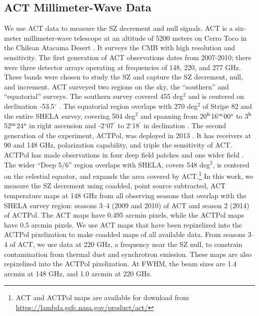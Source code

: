 \documentclass[a4paper,fleqn,usenatbib]{mnras}
\begin{document}
\subsection{ACT Millimeter-Wave Data}
We use ACT data to measure the SZ decrement and null signals. 
ACT is a six-meter millimeter-wave telescope at an altitude of 5200 meters on Cerro Toco in the Chilean Atacama Desert \citep{2011ApJS..194...41S}. 
It surveys the CMB with high resolution and sensitivity. 
The first generation of ACT observations dates from 2007-2010; there were three detector arrays operating at frequencies of 148, 220, and 277 GHz. 
These bands were chosen to study the SZ and capture the SZ decrement, null, and increment. 
ACT surveyed two regions on the sky, the ``southern'' and ``equatorial'' surveys. 
The southern survey covered 455 deg$^2$ and is centered on declination -53.5$^{\circ}$ \citep{2011ApJ...731..100M}. 
The equatorial region overlaps with 270 deg$^2$ of Stripe 82 and the entire SHELA survey, covering 504 deg$^2$ and spanning from 20$^{\rm h}$16$^{\rm m}$00$^{\rm s}$ to 3$^{\rm h}$52$^{\rm m}$24$^{\rm s}$ in right ascension and -2$^{\circ}$07$^{\prime}$ to 2$^{\circ}$18$^{\prime}$ in declination \citep{2013JCAP...07..008H}. 
The second generation of the experiment, ACTPol, was deployed in 2013   \citep{2016ApJS..227...21T}.
It has receivers at 90 and 148 GHz, polarization capability,  and triple the sensitivity of ACT. 
ACTPol has made observations in four deep field patches and one wider field \citep{2014JCAP...10..007N,2018ApJS..235...20H}. 
The wider ``Deep 5/6'' region overlaps with SHELA, covers 548 deg$^2$, is centered on the celestial equator, and expands the area covered by ACT.\footnote{ACT and ACTPol maps are available for download from \url{https://lambda.gsfc.nasa.gov/product/act/}}
In this work, we measure the SZ decrement using coadded, point source subtracted, ACT temperature maps at 148 GHz from all observing seasons that overlap with the SHELA survey region: seasons 3--4 (2009 and 2010) of ACT and season 2 (2014) of ACTPol. 
The ACT maps have 0.495 arcmin pixels, while the ACTPol maps have 0.5 arcmin pixels. 
We use ACT maps that have been repixelized into the ACTPol pixelization to make coadded maps of all available data. %
From seasons 3--4 of ACT, we use data at 220 GHz, a frequency near the SZ null, to constrain contamination from thermal dust and synchrotron emission. 
These maps are also repixelized into the ACTPol pixelization. 
At FWHM, the beam sizes are 1.4 arcmin at 148 GHz, and 1.0 arcmin at 220 GHz.
\end{document}
